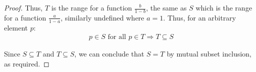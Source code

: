 \documentclass[12pt, a4paper]{article}
\begin{document}
\begin{proof}
    Thus, $T$ is the range for a function $\tfrac{b}{1 - b}$, the same as $S$ which is the range
    for a function $\tfrac{a}{1 - a}$, similarly undefined where $a = 1$. Thus, for an 
    arbitrary element $p$:
    \begin{align*}
        p \in S \text{ for all } p \in T \Rightarrow T \subseteq S
    \end{align*}

    Since $S \subseteq T$ and $T \subseteq S$, we can conclude that $S = T$ by mutual
    subset inclusion, as required.
\end{proof}
\end{document}
